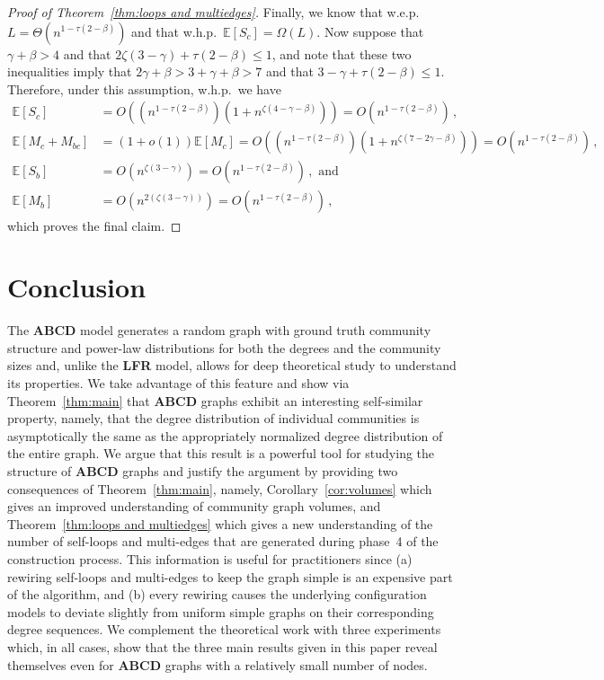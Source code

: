 \documentclass[12pt]{article}
\theoremstyle{definition}
\theoremstyle{remark}
\theoremstyle{remark}
\numberwithin{theorem}{section}
\newcommand{\E}[1]{{\mathbb E}\left[#1\right]}
\begin{document}
\begin{proof}[Proof of Theorem~\ref{thm:loops and multiedges}]
Finally, we know that w.e.p.\ $L = \Theta(n^{1-\tau(2-\beta)})$ and that w.h.p.\ $\E{S_c} = \Omega(L)$. Now suppose that $\gamma+\beta > 4$ and that $2\zeta(3-\gamma) + \tau(2-\beta) \leq 1$, and note that these two inequalities imply that $2\gamma+\beta > 3+\gamma+\beta > 7$ and that $3-\gamma + \tau(2-\beta) \leq 1$. Therefore, under this assumption, w.h.p.\ we have
\begin{align*}
\E{S_c}
&=
O \left( (n^{1-\tau(2-\beta)})(1+n^{\zeta(4-\gamma-\beta)}) \right)
=
O \left(n^{1-\tau(2-\beta)}\right) \,, \\
\E{M_c + M_{bc}}
&=
(1+o(1)) \E{M_c}
=
O \left( (n^{1-\tau(2-\beta)})(1+n^{\zeta(7-2\gamma-\beta)}) \right)
=
O \left(n^{1-\tau(2-\beta)}\right) \,, \\
\E{S_b}
&=
O \left( n^{\zeta(3-\gamma)} \right)
=
O \left( n^{1-\tau(2-\beta)} \right) \,, \text{ and} \\
\E{M_b}
&=
O \left( n^{2(\zeta(3-\gamma))} \right)
=
O \left( n^{1-\tau(2-\beta)} \right) \,,
\end{align*}
which proves the final claim. 
\end{proof}



\section{Conclusion}\label{sec:conclusions}

The \textbf{ABCD} model generates a random graph with ground truth community structure and power-law distributions for both the degrees and the community sizes and, unlike the \textbf{LFR} model, allows for deep theoretical study to understand its properties. We take advantage of this feature and show via Theorem~\ref{thm:main} that \textbf{ABCD} graphs exhibit an interesting self-similar property, namely, that the degree distribution of individual communities is asymptotically the same as the appropriately normalized degree distribution of the entire graph. We argue that this result is a powerful tool for studying the structure of \textbf{ABCD} graphs and justify the argument by providing two consequences of Theorem~\ref{thm:main}, namely, Corollary~\ref{cor:volumes} which gives an improved understanding of community graph volumes, and Theorem~\ref{thm:loops and multiedges} which gives a new understanding of the number of self-loops and multi-edges that are generated during phase~4 of the construction process. 
This information is useful for practitioners since (a) rewiring self-loops and multi-edges to keep the graph simple is an expensive part of the algorithm, and (b) every rewiring causes the underlying configuration models to deviate slightly from uniform simple graphs on their corresponding degree sequences.
We complement the theoretical work with three experiments which, in all cases, show that the three main results given in this paper reveal themselves even for \textbf{ABCD} graphs with a relatively small number of nodes.
\end{document}
